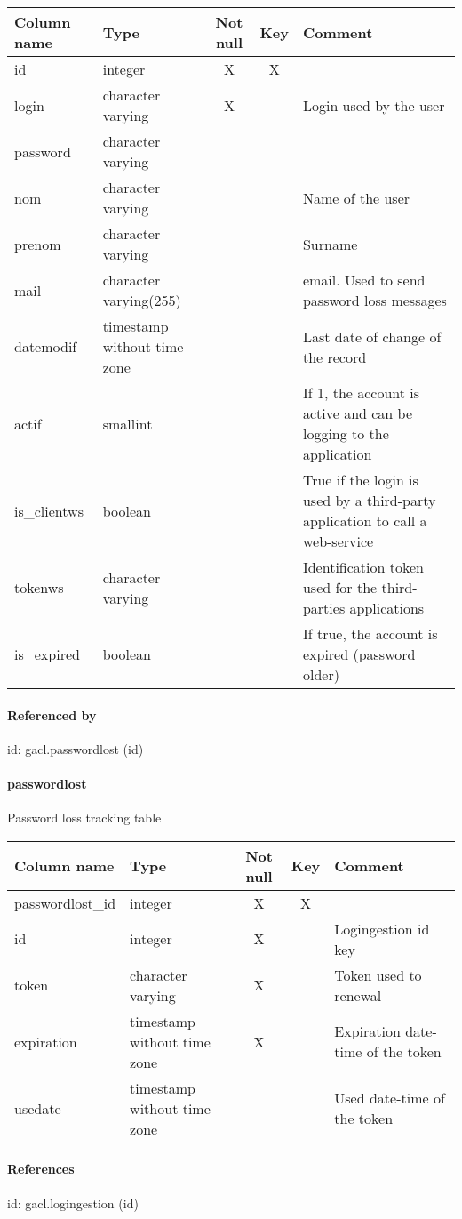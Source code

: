 \begin{tabular}{|l| p{2cm}|c|c| p{5cm}|}
\hline
Column name & Type & Not null & Key & Comment \\
\hline
id & integer & X & X & \\
login & character varying & X &  & Login used by the user\\
password & character varying &  &  & \\
nom & character varying &  &  & Name of the user\\
prenom & character varying &  &  & Surname\\
mail & character varying(255) &  &  & email. Used to send password loss messages\\
datemodif & timestamp without time zone &  &  & Last date of change of the record\\
actif & smallint &  &  & If 1, the account is active and can be logging to the application\\
is\_clientws & boolean &  &  & True if the login is used by a third-party application to call a web-service\\
tokenws & character varying &  &  & Identification token used for the third-parties applications\\
is\_expired & boolean &  &  & If true, the account is expired (password older)\\
\hline
\end{tabular}
\paragraph{Referenced by}
id: gacl.passwordlost (id)

\paragraph{passwordlost}
Password loss tracking table

\begin{tabular}{|l| p{2cm}|c|c| p{5cm}|}
\hline
Column name & Type & Not null & Key & Comment \\
\hline
passwordlost\_id & integer & X & X & \\
id & integer & X &  & Logingestion id key\\
token & character varying & X &  & Token used to renewal\\
expiration & timestamp without time zone & X &  & Expiration date-time of the token\\
usedate & timestamp without time zone &  &  & Used date-time of the token\\
\hline
\end{tabular}
\paragraph{References}
id: gacl.logingestion (id)


